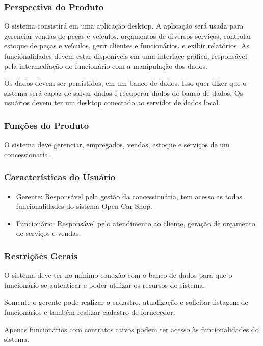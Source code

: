 	\subsubsection{Perspectiva do Produto}
	\par
	O sistema consistirá em uma aplicação  desktop. A aplicação  será usada para gerenciar vendas de peças e veículos, orçamentos de diversos serviços,  controlar estoque de peças e veículos, gerir clientes e funcionários, e exibir  relatórios. As funcionalidades devem estar disponíveis em uma interface gráfica, responsável pela intermediação do funcionário com a manipulação dos dados. 
	\par
	Os dados devem ser persistidos, em um banco de dados. Isso quer dizer que o sistema será capaz de salvar dados e recuperar dados do banco de dados. Os usuários devem ter um desktop conectado  ao servidor de dados local. 
	
	
	\subsubsection{Funções do Produto}
	\par
	O sistema deve gerenciar, empregados, vendas, estoque e serviços de um concessionaria. 
	
	\subsubsection{Características do Usuário}
	
	\begin{itemize}
	\item[] Gerente: Responsável pela gestão da concessionária, tem acesso as todas   funcionalidades  do sistema Open Car Shop.
	\item[] Funcionário: Responsável pelo atendimento ao cliente, geração de orçamento de serviços e vendas.
	\end{itemize}

	\subsubsection{Restrições Gerais}
	\par
	O sistema deve ter no mínimo conexão com o banco de dados para que o funcionário se autenticar e poder utilizar os recursos do sistema. 
	\par
	Somente o gerente pode realizar o cadastro, atualização  e solicitar listagem de funcionários e também realizar cadastro de fornecedor.
	\par
	Apenas funcionários com contratos ativos podem ter acesso às funcionalidades do sistema.

